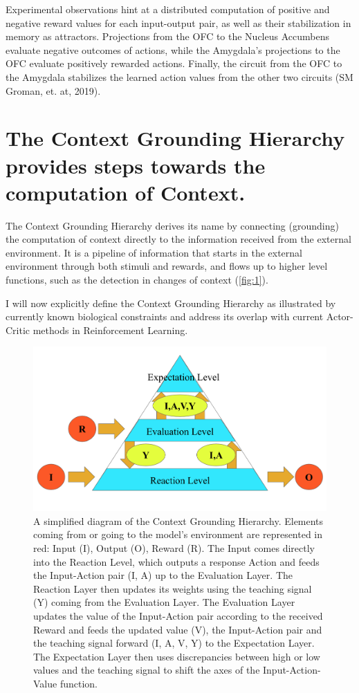 \documentclass[11pt]{article}
\begin{document}
Experimental observations hint at a distributed computation of positive and negative reward values for each input-output pair, as well as their stabilization in memory as attractors.  Projections from the OFC to the Nucleus Accumbens evaluate negative outcomes of actions, while the Amygdala's projections to the OFC evaluate positively rewarded actions.  Finally, the circuit from the OFC to the Amygdala stabilizes the learned action values from the other two circuits (SM Groman, et. at, 2019).

\section{The Context Grounding Hierarchy provides steps towards the computation of Context.}
The Context Grounding Hierarchy derives its name by connecting (grounding) the computation of context directly to the information received from the external environment.  It is a pipeline of information that starts in the external environment through both stimuli and rewards, and flows up to higher level functions, such as the detection in changes of context (\autoref{fig:1}).

I will now explicitly define the Context Grounding Hierarchy as illustrated by currently known biological constraints and address its overlap with current Actor-Critic methods in Reinforcement Learning.  

\begin{figure}
	\centering
	\includegraphics[scale=0.4]{./context_grounding_hierarchy.png}
	\caption{A simplified diagram of the Context Grounding Hierarchy.  Elements coming from or going to the model's environment are represented in red: Input (I), Output (O), Reward (R).  The Input comes directly into the Reaction Level, which outputs a response Action and feeds the Input-Action pair (I, A) up to the Evaluation Layer.  The Reaction Layer then updates its weights using the teaching signal (Y) coming from the Evaluation Layer.  The Evaluation Layer updates the value of the Input-Action pair according to the received Reward and feeds the updated value (V), the Input-Action pair and the teaching signal forward (I, A, V, Y) to the Expectation Layer.  The Expectation Layer then uses discrepancies between high or low values and the teaching signal to shift the axes of the Input-Action-Value function. }
	\label{fig:1}
\end{figure}
\end{document}
